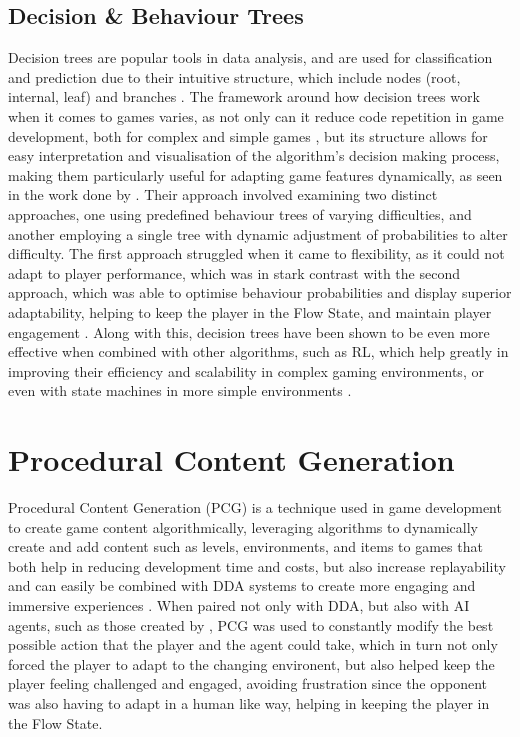 \begin{spacing}{2.0}
	\subsection{Decision \& Behaviour Trees}

	Decision trees are popular tools in data analysis, and are used for classification and prediction due to their intuitive structure, which include nodes (root, internal, leaf) and branches \cite{song_decision_2015} \cite{mienye_survey_2024}.
	The framework around how decision trees work when it comes to games varies, as not only can it reduce code repetition in game development, both for complex and simple games \cite{vuong_artificial_2020}, but its structure allows for easy
	interpretation and visualisation of the algorithm's decision making process, making them particularly useful for adapting game features dynamically, as seen in the work done by \cite{sejrsgaard_jacobsen_dynamic_2011}.
	Their approach involved examining two distinct approaches, one using predefined behaviour trees of varying difficulties, and another employing a single tree with dynamic adjustment of probabilities to alter difficulty.
	The first approach struggled when it came to flexibility, as it could not adapt to player performance, which was in stark contrast with the second approach, which was able to optimise behaviour probabilities
	and display superior adaptability, helping to keep the player in the Flow State, and maintain player engagement \cite{sejrsgaard_jacobsen_dynamic_2011}. Along with this, decision trees have been shown to be even more effective when combined with
	other algorithms, such as RL, which help greatly in improving their efficiency and scalability in complex gaming environments, or even with state machines in more simple environments \cite{mcquillan_survey_nodate} \cite{sejrsgaard_jacobsen_dynamic_2011}.


	\section{Procedural Content Generation}

	Procedural Content Generation (PCG) is a technique used in game development to create game content algorithmically, leveraging algorithms to dynamically create and add content such as levels, environments,
	and items to games that both help in reducing development time and costs, but also increase replayability and can easily be combined with DDA systems to create more engaging and immersive experiences \cite{laus_dynamic_2022}.
	When paired not only with DDA, but also with AI agents, such as those created by \cite{grech_creating_2023}, PCG was used to constantly modify the best possible action that the player and the agent could take, which in turn
	not only forced the player to adapt to the changing environent, but also helped keep the player feeling challenged and engaged, avoiding frustration since the opponent was also having to adapt in a human like way,
	helping in keeping the player in the Flow State.


\end{spacing}
